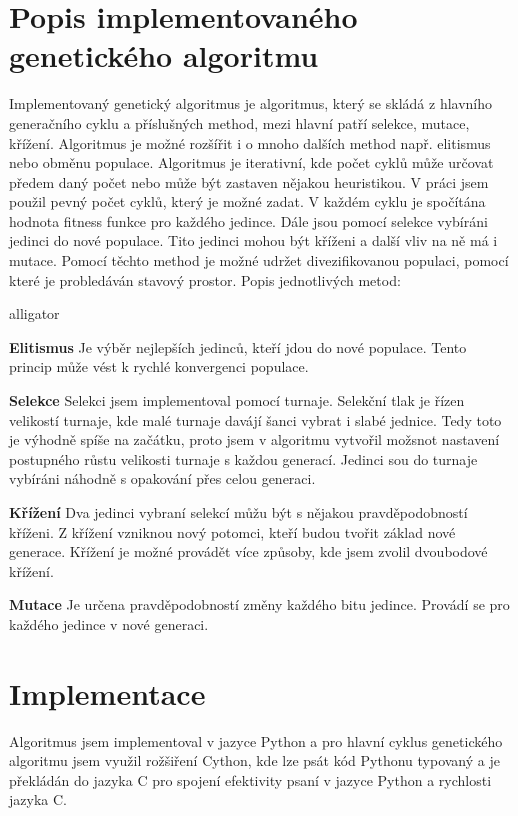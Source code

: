 \documentclass[11pt]{article}
\begin{document}
\section{Popis implementovaného genetického algoritmu}\label{kap:popisALG}
Implementovaný genetický algoritmus je algoritmus, který se skládá z hlavního generačního cyklu a příslušných method, mezi hlavní patří selekce, mutace, křížení. Algoritmus je možné rozšířit i o mnoho dalších method např. elitismus nebo obměnu populace. Algoritmus je iterativní, kde počet cyklů může určovat předem daný počet nebo může být zastaven nějakou heuristikou. V práci jsem použil pevný počet cyklů, který je možné zadat. V každém cyklu je spočítána hodnota fitness funkce pro každého jedince. Dále jsou pomocí selekce vybíráni jedinci do nové populace. Tito jedinci mohou být kříženi a další vliv na ně má i mutace. Pomocí těchto method je možné udržet divezifikovanou populaci, pomocí které je probledáván stavový prostor. Popis jednotlivých metod:
\begin{labeling}{alligator}
\item[\textbf{Elitismus}] Je výběr nejlepších jedinců, kteří jdou do nové populace. Tento princip může vést k rychlé konvergenci populace.
\item[\textbf{Selekce}] Selekci jsem implementoval pomocí turnaje. Selekční tlak je řízen velikostí turnaje, kde malé turnaje davájí šanci vybrat i slabé jednice. Tedy toto je výhodně spíše na začátku, proto jsem v algoritmu vytvořil možsnot nastavení postupného růstu velikosti turnaje s každou generací. Jedinci sou do turnaje vybíráni náhodně s opakování přes celou generaci. 
\item[\textbf{Křížení}] Dva jedinci vybraní selekcí můžu být s nějakou pravděpodobností kříženi. Z křížení vzniknou nový potomci, kteří budou tvořit základ nové generace. Křížení je možné provádět více způsoby, kde jsem zvolil dvoubodové křížení.
\item[\textbf{Mutace}] Je určena pravděpodobností změny každého bitu jedince. Provádí se pro každého jedince v nové generaci.

\end{labeling}
\section{Implementace}\label{kap:implementace}
Algoritmus jsem implementoval v jazyce Python a pro hlavní cyklus genetického algoritmu jsem využil rožšiření Cython, kde lze psát kód Pythonu typovaný a je překládán do jazyka C pro spojení efektivity psaní v jazyce Python a rychlosti jazyka C. 
\end{document}
